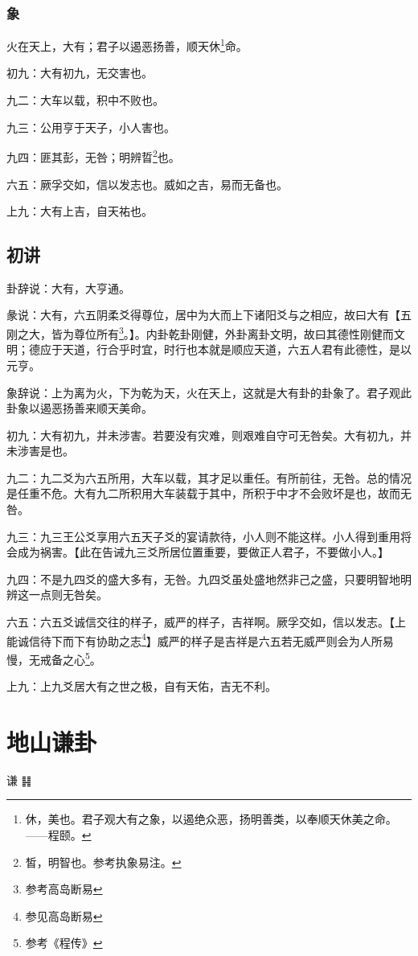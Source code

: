 \documentclass[12pt,oneside]{book}
\begin{document}
\subsection{象}
火在天上，大有；君子以遏恶扬善，顺天休\footnote{休，美也。君子观大有之象，以遏绝众恶，扬明善类，以奉顺天休美之命。——程颐。}命。

初九：大有初九，无交害也。

九二：大车以载，积中不败也。

九三：公用亨于天子，小人害也。

九四：匪其彭，无咎；明辨晢\footnote{皙，明智也。参考执象易注。}也。

六五：厥孚交如，信以发志也。威如之吉，易而无备也。

上九：大有上吉，自天祐也。


\section{初讲}
卦辞说：大有，大亨通。

彖说：大有，六五阴柔爻得尊位，居中为大而上下诸阳爻与之相应，故曰大有【五刚之大，皆为尊位所有\footnote{参考高岛断易}。】。内卦乾卦刚健，外卦离卦文明，故曰其德性刚健而文明；德应于天道，行合乎时宜，时行也本就是顺应天道，六五人君有此德性，是以元亨。

象辞说：上为离为火，下为乾为天，火在天上，这就是大有卦的卦象了。君子观此卦象以遏恶扬善来顺天美命。

初九：大有初九，并未涉害。若要没有灾难，则艰难自守可无咎矣。大有初九，并未涉害是也。

九二：九二爻为六五所用，大车以载，其才足以重任。有所前往，无咎。总的情况是任重不危。大有九二所积用大车装载于其中，所积于中才不会败坏是也，故而无咎。

九三：九三王公爻享用六五天子爻的宴请款待，小人则不能这样。小人得到重用将会成为祸害。【此在告诫九三爻所居位置重要，要做正人君子，不要做小人。】

九四：不是九四爻的盛大多有，无咎。九四爻虽处盛地然非己之盛，只要明智地明辨这一点则无咎矣。

六五：六五爻诚信交往的样子，威严的样子，吉祥啊。厥孚交如，信以发志。【上能诚信待下而下有协助之志\footnote{参见高岛断易}】威严的样子是吉祥是六五若无威严则会为人所易慢，无戒备之心\footnote{参考《程传》}。

上九：上九爻居大有之世之极，自有天佑，吉无不利。



\chapter{地山谦卦}
谦 {\Large ䷎}
\end{document}
